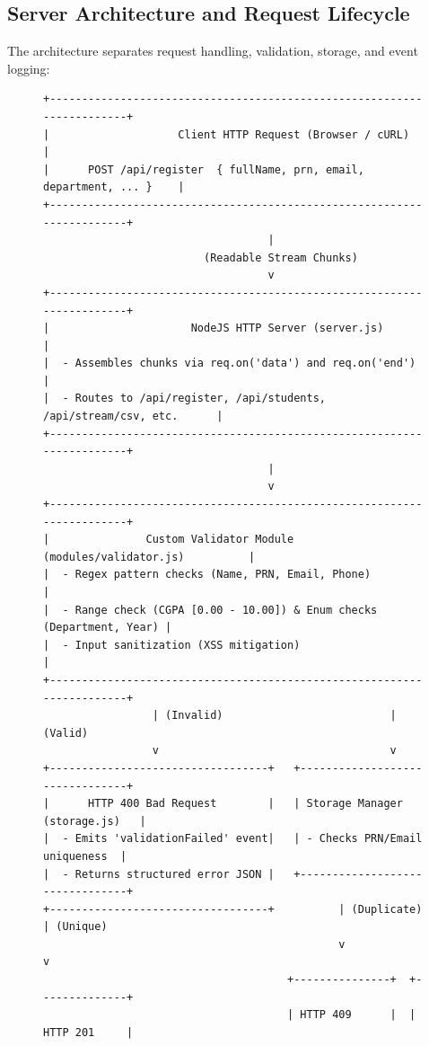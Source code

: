 \documentclass[11pt,a4paper]{article}
\begin{document}
\subsection{Server Architecture and Request Lifecycle}
The architecture separates request handling, validation, storage, and event logging:

\begin{figure}[htbp]
\centering
\begin{tcolorbox}[colback=codebg,colframe=collegeblue,arc=2mm,title=\textbf{Figure 1: NodeJS Server Architecture and Stream Data Flow}]
\small
\begin{verbatim}
+-----------------------------------------------------------------------+
|                    Client HTTP Request (Browser / cURL)               |
|      POST /api/register  { fullName, prn, email, department, ... }    |
+-----------------------------------------------------------------------+
                                   |
                         (Readable Stream Chunks)
                                   v
+-----------------------------------------------------------------------+
|                      NodeJS HTTP Server (server.js)                   |
|  - Assembles chunks via req.on('data') and req.on('end')              |
|  - Routes to /api/register, /api/students, /api/stream/csv, etc.      |
+-----------------------------------------------------------------------+
                                   |
                                   v
+-----------------------------------------------------------------------+
|               Custom Validator Module (modules/validator.js)          |
|  - Regex pattern checks (Name, PRN, Email, Phone)                     |
|  - Range check (CGPA [0.00 - 10.00]) & Enum checks (Department, Year) |
|  - Input sanitization (XSS mitigation)                                |
+-----------------------------------------------------------------------+
                 | (Invalid)                          | (Valid)
                 v                                    v
+----------------------------------+   +--------------------------------+
|      HTTP 400 Bad Request        |   | Storage Manager (storage.js)   |
|  - Emits 'validationFailed' event|   | - Checks PRN/Email uniqueness  |
|  - Returns structured error JSON |   +--------------------------------+
+----------------------------------+          | (Duplicate)    | (Unique)
                                              v                v
                                      +---------------+  +--------------+
                                      | HTTP 409      |  | HTTP 201     |

\end{verbatim}
\end{tcolorbox}
\end{figure}
\end{document}
